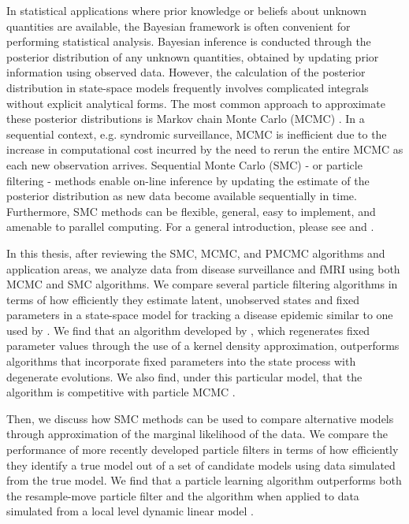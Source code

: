 In statistical applications where prior knowledge or beliefs about unknown quantities are available, the Bayesian framework is often convenient for performing statistical analysis.  Bayesian inference is conducted through the posterior distribution of any unknown quantities, obtained by updating prior information using observed data. However, the calculation of the posterior distribution in state-space models frequently involves complicated integrals without explicit analytical forms. The most common approach to approximate these posterior distributions is Markov chain Monte Carlo (MCMC) \citep{Gelf:Smit:samp:1990}. In a sequential context, e.g. syndromic surveillance, MCMC is inefficient due to the increase in computational cost incurred by the need to rerun the entire MCMC as each new observation arrives. Sequential Monte Carlo (SMC) - or particle filtering - methods enable on-line inference by updating the estimate of the posterior distribution as new data become available sequentially in time. Furthermore, SMC methods can be flexible, general, easy to implement, and amenable to parallel computing. For a general introduction, please see \cite{Douc:deFr:Gord:sequ:2001} and \cite{cappe2007overview}.

In this thesis, after reviewing the SMC, MCMC, and PMCMC algorithms and application areas, we analyze data from disease surveillance and fMRI using both MCMC and SMC algorithms. We compare several particle filtering algorithms in terms of how efficiently they estimate latent, unobserved states and fixed parameters in a state-space model for tracking a disease epidemic similar to one used by \citet{skvortsov2012monitoring}. We find that an algorithm developed by \citet{Liu:West:comb:2001}, which regenerates fixed parameter values through the use of a kernel density approximation, outperforms algorithms that incorporate fixed parameters into the state process with degenerate evolutions. We also find, under this particular model, that the \citet{Liu:West:comb:2001} algorithm is competitive with particle MCMC \citep{Andr:Douc:Hol:pmcmc:2010}.

Then, we discuss how SMC methods can be used to compare alternative models through approximation of the marginal likelihood of the data. We compare the performance of more recently developed particle filters in terms of how efficiently they identify a true model out of a set of candidate models using data simulated from the true model. We find that a particle learning algorithm \citep{Carv:Joha:Lope:Pols:part} outperforms both the resample-move particle filter \citep{Gilk:Berz:foll:2001} and the \citet{Liu:West:comb:2001} algorithm when applied to data simulated from a local level dynamic linear model \cite[Section 4.3.1][]{petris:camp:2009:dynamic}.

